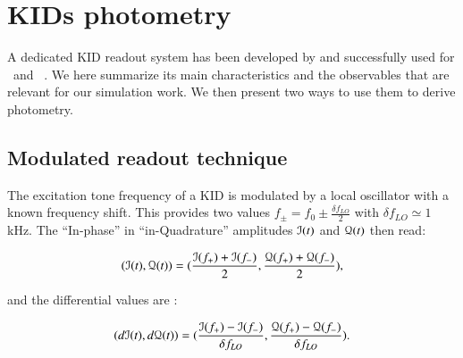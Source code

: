 
\section{KIDs photometry}
\label{sec:signal}

A dedicated KID readout system has been developed by
\citet{2013A&A...551L..12C} and successfully used for \nika\ and
\ . We here summarize its
main characteristics and the observables that are
relevant for our simulation work. We then present two ways to use them to derive photometry.


\subsection{Modulated readout technique}
The excitation tone frequency of a KID is modulated by a local oscillator with a
known frequency shift. This provides two values $f_{\pm} = f_0 \pm \frac{\delta
  f_{LO}}{2}$ with $\delta f_{LO} \simeq 1$\,kHz. The ``In-phase'' in
``in-Quadrature'' amplitudes $\mathcal{I}(t)$ and $\mathcal{Q}(t)$ then read:

\begin{equation}
(\mathcal{I}(t), \mathcal{Q}(t)) = (\frac{\mathcal{I}(f_{+}) +
    \mathcal{I}(f_{-})}{2},
\frac{\mathcal{Q}(f_{+}) + \mathcal{Q}(f_{-})}{2}),
\end{equation}

and the differential values are :

\begin{equation}
\label{gradient}
(d\mathcal{I}(t), d\mathcal{Q}(t)) =
(\frac{\mathcal{I}(f_{+}) - \mathcal{I}(f_{-})}{\delta f_{LO}},
\frac{\mathcal{Q}(f_{+}) - \mathcal{Q}(f_{-})}{\delta f_{LO}}).
\end{equation}

